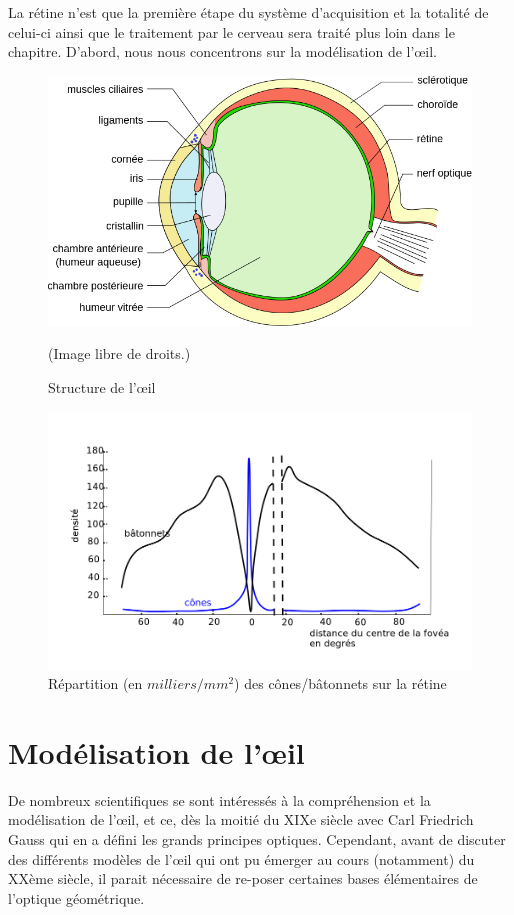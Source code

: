 	\par La rétine n'est que la première étape du système d'acquisition et la totalité de celui-ci ainsi que le traitement par le cerveau sera traité plus loin dans le chapitre. D'abord, nous nous concentrons sur la modélisation de l'œil.
	
	\begin{figure}
		\centering
		\includegraphics[scale=.4]{Figures/SchemaOeil}
		\caption{Structure de l'œil}{(Image libre de droits.)}
		\label{fig:oeil}
	\end{figure}
	
	\begin{figure}
		\centering
		\includegraphics[scale=.35]{Figures/DensiteConesBatonnets}
		\caption{Répartition (en $milliers/mm^2$) des cônes/bâtonnets sur la rétine}
		\label{fig:densite_cones_batonnets}
	\end{figure}
	
	\section{Modélisation de l'œil}
	\par De nombreux scientifiques se sont intéressés à la compréhension et la modélisation de l'œil, et ce, dès la moitié du XIXe siècle avec Carl Friedrich Gauss qui en a défini les grands principes optiques. Cependant, avant de discuter des différents modèles de l'œil qui ont pu émerger au cours (notamment) du XXème siècle, il parait nécessaire de re-poser certaines bases élémentaires de l'optique géométrique.
	
